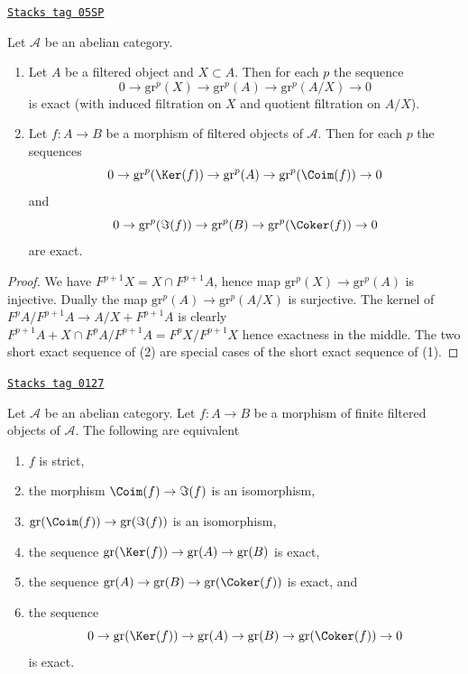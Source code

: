 \begin{lemma}[Ses gr]
\label{homology-lemma-ses-gr}
\href{https://stacks.math.columbia.edu/tag/05SP}{\texttt{Stacks tag 05SP}}

Let $\mathcal{A}$ be an abelian category.
\begin{enumerate}
\item Let $A$ be a filtered object and $X \subset A$. Then for each $p$
the sequence
$$
0 \to \text{gr}^p(X) \to \text{gr}^p(A) \to \text{gr}^p(A/X) \to 0
$$
is exact (with induced filtration on $X$ and quotient filtration on $A/X$).
\item Let $f : A \to B$ be a morphism of filtered objects of $\mathcal{A}$.
Then for each $p$ the sequences
$$
0 \to \text{gr}^p(\Ker(f)) \to \text{gr}^p(A) \to
\text{gr}^p(\Coim(f)) \to 0
$$
and
$$
0 \to \text{gr}^p(\Im(f)) \to \text{gr}^p(B) \to
\text{gr}^p(\Coker(f)) \to 0
$$
are exact.
\end{enumerate}
\end{lemma}

\begin{proof}
We have $F^{p + 1}X = X \cap F^{p + 1}A$, hence map
$\text{gr}^p(X) \to \text{gr}^p(A)$ is injective. Dually the map
$\text{gr}^p(A) \to \text{gr}^p(A/X)$ is surjective.
The kernel of $F^pA/F^{p + 1}A \to A/X + F^{p + 1}A$
is clearly $F^{p + 1}A + X \cap F^pA/F^{p + 1}A = F^pX/F^{p + 1}X$
hence exactness in the middle.
The two short exact sequence of (2) are special cases of the
short exact sequence of (1).
\end{proof}

\begin{lemma}
\label{homology-lemma-characterize-strict}
\href{https://stacks.math.columbia.edu/tag/0127}{\texttt{Stacks tag 0127}}

Let $\mathcal{A}$ be an abelian category.
Let $f : A \to B$ be a morphism of finite
filtered objects of $\mathcal{A}$. The following are equivalent
\begin{enumerate}
\item $f$ is strict,
\item the morphism $\Coim(f) \to \Im(f)$ is an isomorphism,
\item $\text{gr}(\Coim(f)) \to \text{gr}(\Im(f))$ is an
isomorphism,
\item the sequence
$\text{gr}(\Ker(f)) \to \text{gr}(A) \to \text{gr}(B)$
is exact,
\item the sequence $\text{gr}(A) \to \text{gr}(B) \to
\text{gr}(\Coker(f))$ is exact, and
\item the sequence
$$
0 \to
\text{gr}(\Ker(f)) \to
\text{gr}(A) \to
\text{gr}(B) \to
\text{gr}(\Coker(f)) \to 0
$$
is exact.
\end{enumerate}
\end{lemma}

